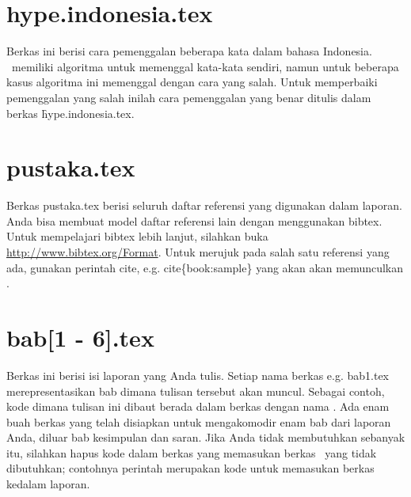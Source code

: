 \section{hype.indonesia.tex}
Berkas ini berisi cara pemenggalan beberapa kata dalam bahasa Indonesia. 
\latex~memiliki algoritma untuk memenggal kata-kata sendiri, namun untuk beberapa kasus algoritma ini memenggal dengan cara yang salah. 
Untuk memperbaiki pemenggalan yang salah inilah cara pemenggalan yang benar ditulis dalam berkas \f{hype.indonesia.tex}.


\section{pustaka.tex}
Berkas pustaka.tex berisi seluruh daftar referensi yang digunakan dalam 
laporan. 
Anda bisa membuat model daftar referensi lain dengan menggunakan bibtex.
Untuk mempelajari bibtex lebih lanjut, silahkan buka \url{http://www.bibtex.org/Format}. 
Untuk merujuk pada salah satu referensi yang ada, gunakan perintah \bslash cite, e.g. \bslash cite\{book:sample\} yang akan akan memunculkan \cite{book:sample}.


\section{bab[1 - 6].tex}
Berkas ini berisi isi laporan yang Anda tulis. 
Setiap nama berkas e.g. bab1.tex merepresentasikan bab dimana tulisan tersebut akan muncul. 
Sebagai contoh, kode dimana tulisan ini dibaut berada dalam berkas dengan nama . 
Ada enam buah berkas yang telah disiapkan untuk mengakomodir enam bab dari laporan Anda, diluar bab kesimpulan dan saran. 
Jika Anda tidak membutuhkan sebanyak itu, silahkan hapus kode dalam berkas  yang memasukan berkas \latex~yang tidak dibutuhkan; contohnya perintah  merupakan kode untuk memasukan berkas  kedalam laporan.

